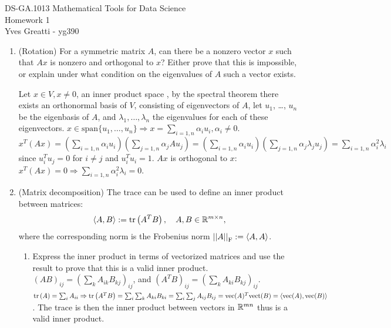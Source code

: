 \documentclass[12pt,twoside]{article}
\begin{document}
\noindent DS-GA.1013 Mathematical Tools for Data Science \\
Homework 1 \\
Yves Greatti - yg390\\


\begin{enumerate}
\item (Rotation) For a symmetric matrix $A$, can there be a nonzero vector $x$ such that $Ax$ is nonzero and orthogonal to $x$? Either prove that this is impossible, or explain under what condition on the eigenvalues of $A$ such a vector exists.
 
Let $x \in V, x \neq 0$, an inner product space , by the spectral theorem there exists an orthonormal basis of  $V$, consisting of eigenvectors of $A$, let $u_1$, \ldots, $u_n$ be the eigenbasis of $A$, and $\lambda_1, \ldots, \lambda_n$ the eigenvalues for each of these eigenvectors.
$x \in \text{span}\{u_1, \ldots, u_n \} \Rightarrow  x=\sum_{i=1,n} \alpha_i u_i, \alpha_i \neq 0$.  $x^T (Ax) = (\sum_{i=1,n} \alpha_i u_i) (\sum_{j=1,n} \alpha_j A u_j) =  (\sum_{i=1,n} \alpha_i u_i) (\sum_{j=1,n} \alpha_j \lambda_j u_j) = \sum_{i=1,n} \alpha_i^2 \lambda_i$ since $u_i^T u_j = 0$ for $i \neq j$ and $u_i^T u_i =1$. $Ax$ is orthogonal to $x$: $x^T (Ax) = 0 \Rightarrow  \sum_{i=1,n} \alpha_i^2 \lambda_i = 0$.
\newpage

\item (Matrix decomposition) The trace can be used to define an inner product between matrices:
\begin{align}
\left \langle A, B\right \rangle := \operatorname{tr}\left( A^TB \right), \quad A,B \in \mathbb{R}^{m \times n},
\end{align}
where the corresponding norm is the Frobenius norm $\left|\left| A \right|\right| _{\operatorname{F}}:=\left \langle A, A\right \rangle$.
\begin{enumerate}
\item Express the inner product in terms of vectorized matrices and use the result to prove that this is a valid inner product.
$(A B)_{ij} = (\sum_k A_{ik} B_{kj})_{ij}$, and $(A^TB) _{ij} = (\sum_k A_{ki} B_{kj})_{ij}$.
$\operatorname{tr}\left( A \right) = \sum_i A_{ii}  \Rightarrow \operatorname{tr}\left( A^TB \right) = \sum_i \sum_k A_{ki} B_{ki} = \sum_i \sum_j A_{ij} B_{ij} = \text{vec}(A)^T \text{vect}(B) = \left \langle \text{vec}(A), \text{vec}(B)\right \rangle$.
The trace is then the inner product between vectors in $\mathbb{R}^{mn}$ thus is a valid inner product.


\end{enumerate}
\end{enumerate}
\end{document}
